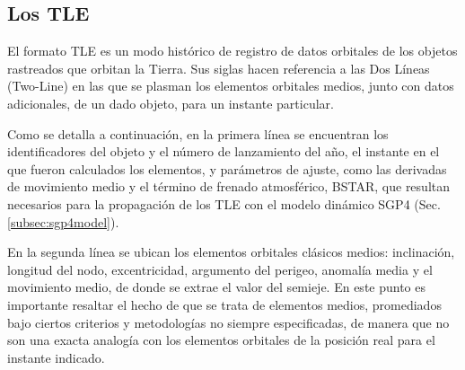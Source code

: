 {\subsection{Los TLE}{\label{subsec:tleformat}}

El formato TLE es un modo hist\'orico de registro de datos orbitales de los objetos rastreados que orbitan la Tierra. Sus siglas  hacen referencia a las Dos L\'ineas (Two-Line) en las que se plasman los elementos orbitales medios, junto con datos adicionales, de un dado objeto, para un instante particular.

Como se detalla a continuación, en la primera l\'inea se encuentran los identificadores del objeto y el n\'umero de lanzamiento del año, el instante en el que fueron calculados los elementos, y parámetros de ajuste, como las derivadas de movimiento medio y el t\'ermino de frenado atmosf\'erico, BSTAR, que resultan necesarios para la propagación de los TLE con el modelo dinámico SGP4 (Sec. \ref{subsec:sgp4model}).

En la segunda l\'inea se ubican los elementos orbitales cl\'asicos medios: inclinaci\'on, longitud del nodo, excentricidad, argumento del perigeo, anomal\'ia media y el movimiento medio, de donde se extrae el valor del semieje. En este punto es importante resaltar el hecho de que se trata de elementos medios, promediados bajo ciertos criterios y metodologías no siempre especificadas, de manera que no son una exacta analog\'ia con los elementos orbitales de la posici\'on real para el instante indicado.


\begin{center}
\end{center}}
